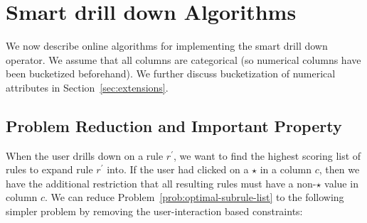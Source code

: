 \documentclass[10pt,journal,compsoc]{IEEEtran}
\newcounter{prob}
\newcommand{\eat}[1]{}
\newcommand{\papertext}[1]{#1}
\begin{document}

\section{Smart drill down Algorithms} \label{sec:algorithms}
We now describe online algorithms for implementing
the smart drill down operator. We assume that all columns are categorical (so numerical columns have been bucketized beforehand). \eat{We further discuss bucketization of numerical attributes in the Extensions section in the technical report~\cite{tr}}\papertext{We further discuss bucketization of numerical attributes in Section~\ref{sec:extensions}}.


\subsection{Problem Reduction and Important Property} \label{sec:reduction}
When the user drills down on a rule $r^{\prime}$, we want to find the highest scoring list of rules to expand rule $r^{\prime}$ into. If the user had clicked on a $\star$ in a column $c$, then we have the additional restriction that all resulting rules must have a non-$\star$ value in column $c$. We can reduce Problem~\ref{prob:optimal-subrule-list} to the following simpler problem by removing the user-interaction based constraints: 
\end{document}
